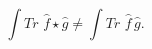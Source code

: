 \begin{equation}
\int Tr\,\,\widehat{f}\star \widehat{g}\neq \int Tr\,\,\widehat{f}\,\widehat{g}. 
\end{equation}


